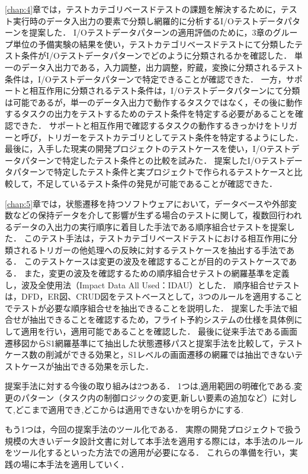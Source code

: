 \ref{chap:4}章では，テストカテゴリベースドテストの課題を解決するために，テスト実行時のデータ入出力の要素で分類し網羅的に分析するI/Oテストデータパターンを提案した．
I/Oテストデータパターンの適用評価のために，3章のグループ単位の予備実験の結果を使い，テストカテゴリベースドテストにて分類したテスト条件がI/Oテストデータパターンでどのように分類されるかを確認した．
単一のデータ入出力である，入力調整，出力調整，貯蔵，変換に分類されるテスト条件は，I/Oテストデータパターンで特定できることが確認できた．
一方，サポートと相互作用に分類されるテスト条件は，I/Oテストデータパターンにて分類は可能であるが，単一のデータ入出力で動作するタスクではなく，その後に動作するタスクの出力をテストするためのテスト条件を特定する必要があることを確認できた．
サポートと相互作用で確認するタスクの動作するきっかけをトリガーと呼び，トリガーをテストカテゴリとしてテスト条件を特定するようにした．
最後に，入手した現実の開発プロジェクトのテストケースを使い，I/Oテストデータパターンで特定したテスト条件との比較を試みた．
提案したI/Oテストデータパターンで特定したテスト条件と実プロジェクトで作られるテストケースと比較して，不足しているテスト条件の発見が可能であることが確認できた．

\ref{chap:5}章では，状態遷移を持つソフトウェアにおいて，データベースや外部変数などの保持データを介して影響が生ずる場合のテストに関して，複数回行われるデータの入出力の実行順序に着目した手法である順序組合せテストを提案した．
このテスト手法は，テストカテゴリベースドテストにおける相互作用に分類されるトリガーの他処理への反映に対するテストケースを抽出する手法である．
このテストケースは変更の波及を確認することが目的のテストケースである．
また，変更の波及を確認するための順序組合せテストの網羅基準を定義し，波及全使用法（Impact Data All Used：IDAU）とした．
順序組合せテストは，DFD，ER図、CRUD図をテストベースとして，3つのルールを適用することでテストが必要な順序組合せを抽出できることを説明した．
提案した手法で組合せが抽出できることを確認するため，フライト予約システムの仕様を具体例にして適用を行い，適用可能であることを確認した．
最後に従来手法である画面遷移図からS1網羅基準にて抽出した状態遷移パスと提案手法を比較して，テストケース数の削減ができる効果と，S1レベルの画面遷移の網羅では抽出できないテストケースが抽出できる効果を示した．

提案手法に対する今後の取り組みは2つある．
1つは,適用範囲の明確化である.変更のパターン（タスク内の制御ロジックの変更,新しい要素の追加など）に対して,どこまで適用でき,どこからは適用できないかを明らかにする.

もう1つは，今回の提案手法のツール化である．
実際の開発プロジェクトで扱う規模の大きいデータ設計文書に対して本手法を適用する際には，本手法のルールをツール化するといった方法での適用が必要になる．
これらの準備を行い，実践の場に本手法を適用していく．

